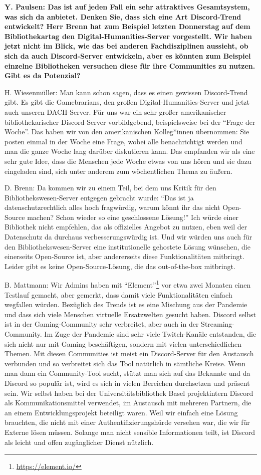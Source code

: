 \documentclass[a4paper,
fontsize=11pt,
oneside,
numbers=noperiodatend,
parskip=half-,
bibliography=totoc,
final
]{scrartcl}
\begin{document}
\textbf{Y. Paulsen: Das ist auf jeden Fall ein sehr attraktives
Gesamtsystem, was sich da anbietet. Denken Sie, dass sich eine Art
Discord-Trend entwickelt? Herr Brenn hat zum Beispiel letzten Donnerstag
auf dem Bibliothekartag den Digital-Humanities-Server vorgestellt. Wir
haben jetzt nicht im Blick, wie das bei anderen Fachdisziplinen
aussieht, ob sich da auch Discord-Server entwickeln, aber es könnten zum
Beispiel einzelne Bibliotheken versuchen diese für ihre Communities zu
nutzen. Gibt es da Potenzial?}

H. Wiesenmüller: Man kann schon sagen, dass es einen gewissen
Discord-Trend gibt. Es gibt die Gamebrarians, den großen
Digital-Humanities-Server und jetzt auch unseren DACH-Server. Für uns
war ein sehr großer amerikanischer bibliothekarischer Discord-Server
vorbildgebend, beispielsweise bei der \enquote{Frage der Woche}. Das
haben wir von den amerikanischen Kolleg*innen übernommen: Sie posten
einmal in der Woche eine Frage, wobei alle benachrichtigt werden und man
die ganze Woche lang darüber diskutieren kann. Das empfanden wir als
eine sehr gute Idee, dass die Menschen jede Woche etwas von uns hören
und sie dazu eingeladen sind, sich unter anderem zum wöchentlichen Thema zu
äußern.

D. Brenn: Da kommen wir zu einem Teil, bei dem uns Kritik für den
Bibliothekswesen-Server entgegen gebracht wurde: \enquote{Das ist ja
datenschutzrechtlich alles hoch fragwürdig, warum könnt ihr das nicht
Open-Source machen? Schon wieder so eine geschlossene Lösung!} Ich würde
einer Bibliothek nicht empfehlen, das als offizielles Angebot zu nutzen,
eben weil der Datenschutz da durchaus verbesserungswürdig ist. Und wir
würden uns auch für den Bibliothekswesen-Server eine institutionelle
gehostete Lösung wünschen, die einerseits Open-Source ist, aber
andererseits diese Funktionalitäten mitbringt. Leider gibt es keine
Open-Source-Lösung, die das out-of-the-box mitbringt.

B. Mattmann: Wir Admins haben mit \enquote{Element}\footnote{\url{https://element.io/}} vor etwa
zwei Monaten einen Testlauf gemacht, aber gemerkt, dass damit viele
Funktionalitäten einfach wegfallen würden. Bezüglich des Trends ist es
eine Mischung aus der Pandemie und dass sich viele Menschen virtuelle
Ersatzwelten gesucht haben. Discord selbst ist in der Gaming-Community
sehr verbreitet, aber auch in der Streaming-Community. Im Zuge der
Pandemie sind sehr viele Twitch-Kanäle entstanden, die sich nicht nur
mit Gaming beschäftigen, sondern mit vielen unterschiedlichen Themen.
Mit diesen Communities ist meist ein Discord-Server für den Austausch
verbunden und so verbreitet sich das Tool natürlich in sämtliche Kreise.
Wenn man dann ein Community-Tool sucht, stützt man sich auf das Bekannte
und da Discord so populär ist, wird es sich in vielen Bereichen
durchsetzen und präsent sein. Wir selbst haben bei der
Universitätsbibliothek Basel projektintern Discord als
Kommunikationsmittel verwendet, im Austausch mit mehreren Partnern, die
an einem Entwicklungsprojekt beteiligt waren. Weil wir einfach eine
Lösung brauchten, die nicht mit einer Authentifizierungshürde versehen
war, die wir für Externe lösen müssen. Solange man nicht sensible
Informationen teilt, ist Discord als leicht und offen zugänglicher
Dienst nützlich.
\end{document}
